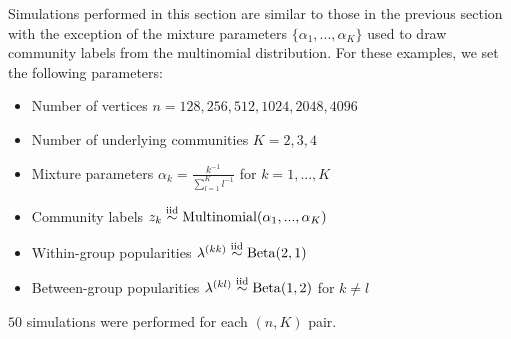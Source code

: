 \documentclass[12pt]{article}
\providecommand{\tightlist}{%
  \setlength{\itemsep}{0pt}\setlength{\parskip}{0pt}}
\begin{document}
Simulations performed in this section are similar to those in the
previous section with the exception of the mixture parameters
\(\{\alpha_1, ..., \alpha_K\}\) used to draw community labels from the
multinomial distribution. For these examples, we set the following
parameters:

\begin{itemize}
\tightlist
\item
  Number of vertices \(n = 128, 256, 512, 1024, 2048, 4096\)
\item
  Number of underlying communities \(K = 2, 3, 4\)
\item
  Mixture parameters \(\alpha_k = \frac{k^{-1}}{\sum_{l=1}^K l^{-1}}\)
  for \(k = 1, ..., K\)
\item
  Community labels
  \(z_k \stackrel{\text{iid}}{\sim} \mathrm{Multinomial}(\alpha_1, ..., \alpha_K)\)
\item
  Within-group popularities
  \(\lambda^{(kk)} \stackrel{\text{iid}}{\sim} \mathrm{Beta}(2, 1)\)
\item
  Between-group popularities
  \(\lambda^{(kl)} \stackrel{\text{iid}}{\sim} \mathrm{Beta}(1, 2)\) for
  \(k \neq l\)
\end{itemize}

\(50\) simulations were performed for each \((n, K)\) pair.

\end{document}
